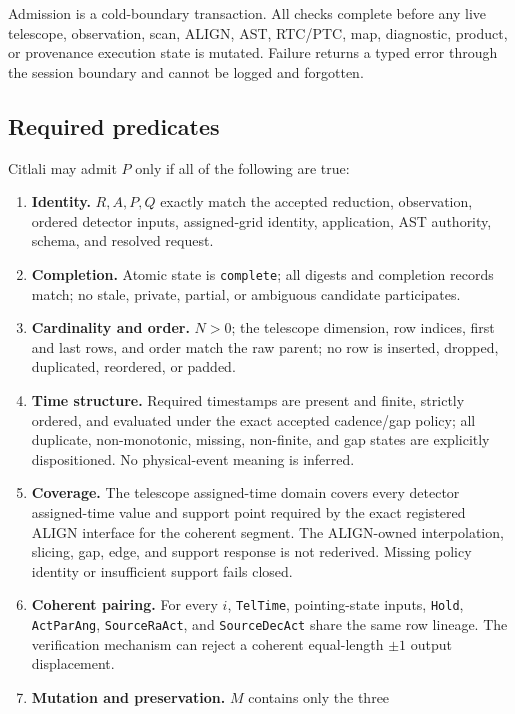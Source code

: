 \documentclass[11pt]{article}
\newcommand{\code}[1]{\texttt{#1}}
\begin{document}
Admission is a cold-boundary transaction.  All checks complete before any
live telescope, observation, scan, ALIGN, AST, RTC/PTC, map, diagnostic,
product, or provenance execution state is mutated.  Failure returns a typed
error through the session boundary and cannot be logged and forgotten.

\subsection{Required predicates}

Citlali may admit $P$ only if all of the following are true:

\begin{enumerate}[label=\textbf{C\arabic*.}]
\item \textbf{Identity.} $R,A,P,Q$ exactly match the accepted reduction,
  observation, ordered detector inputs, assigned-grid identity, application,
  AST authority, schema, and resolved request.
\item \textbf{Completion.} Atomic state is \code{complete}; all digests and
  completion records match; no stale, private, partial, or ambiguous candidate
  participates.
\item \textbf{Cardinality and order.} $N>0$; the telescope dimension, row
  indices, first and last rows, and order match the raw parent; no row is
  inserted, dropped, duplicated, reordered, or padded.
\item \textbf{Time structure.} Required timestamps are present and finite,
  strictly ordered, and evaluated under the exact accepted cadence/gap policy;
  all duplicate, non-monotonic, missing, non-finite, and gap states are
  explicitly dispositioned.  No physical-event meaning is inferred.
\item \textbf{Coverage.} The telescope assigned-time domain covers every
  detector assigned-time value and support point required by the exact
  registered ALIGN interface for the coherent segment.  The ALIGN-owned
  interpolation, slicing, gap, edge, and support response is not rederived.
  Missing policy identity or insufficient support fails closed.
\item \textbf{Coherent pairing.} For every $i$, \code{TelTime}, pointing-state
  inputs, \code{Hold}, \code{ActParAng}, \code{SourceRaAct}, and
  \code{SourceDecAct} share the same row lineage.  The verification mechanism
  can reject a coherent equal-length $\pm1$ output displacement.
\item \textbf{Mutation and preservation.} $M$ contains only the three

\end{enumerate}
\end{document}
